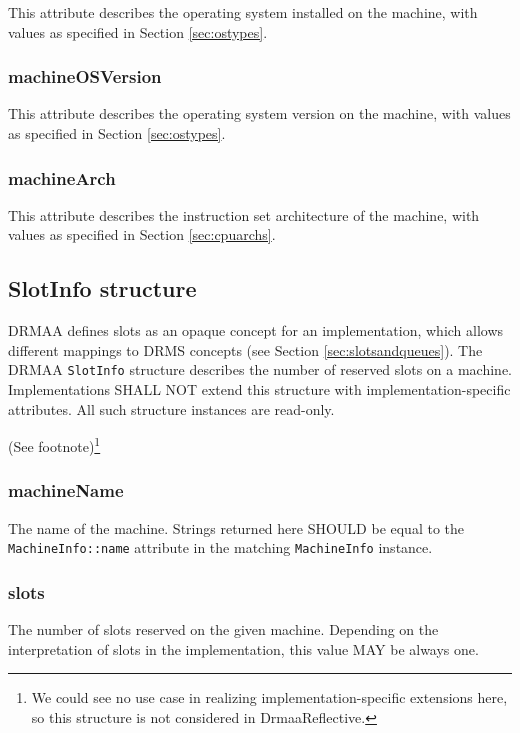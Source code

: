 \documentclass{article}
\newcommand{\h}[1]{\lstinline|#1|}
\newcommand{\rat}[1]{ {\tiny(See footnote)}\footnote{#1} }
\begin{document}
This attribute describes the operating system installed on the machine, with values as specified in Section \ref{sec:ostypes}. 

\subsubsection{machineOSVersion}

This attribute describes the operating system version on the machine, with values as specified in Section \ref{sec:ostypes}. 

\subsubsection{machineArch}

This attribute describes the instruction set architecture of the machine, with values as specified in Section \ref{sec:cpuarchs}. 

\subsection{SlotInfo structure}
\label{sec:slotinfo}

DRMAA defines slots as an opaque concept for an implementation, which allows different mappings to DRMS concepts (see Section \ref{sec:slotsandqueues}). The DRMAA \h{SlotInfo} structure describes the number of reserved slots on a machine. Implementations SHALL NOT extend this structure with implementation-specific attributes. All such structure instances are read-only.

\rat{
We could see no use case in realizing implementation-specific extensions here, so this structure is not considered in DrmaaReflective. 
}



\subsubsection{machineName}

The name of the machine. Strings returned here SHOULD be equal to the  \h{MachineInfo::name} attribute in the matching \h{MachineInfo} instance.

\subsubsection{slots}

The number of slots reserved on the given machine. Depending on the interpretation of slots in the implementation, this value MAY be always one.
\end{document}
